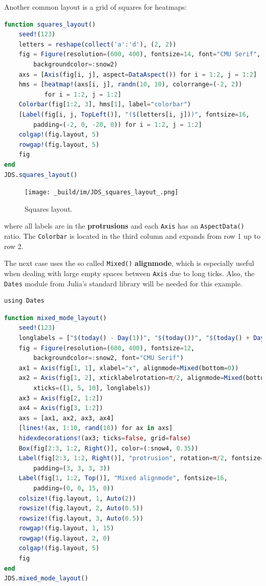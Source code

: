 \documentclass[
  notoc %
]{tufte-book}
\newcommand{\passthrough}[1]{#1}
\begin{document}
Another common layout is a grid of squares for heatmaps:

\begin{lstlisting}[language=Julia]
function squares_layout()
    seed!(123)
    letters = reshape(collect('a':'d'), (2, 2))
    fig = Figure(resolution=(600, 400), fontsize=14, font="CMU Serif",
        backgroundcolor=:snow2)
    axs = [Axis(fig[i, j], aspect=DataAspect()) for i = 1:2, j = 1:2]
    hms = [heatmap!(axs[i, j], randn(10, 10), colorrange=(-2, 2))
           for i = 1:2, j = 1:2]
    Colorbar(fig[1:2, 3], hms[1], label="colorbar")
    [Label(fig[i, j, TopLeft()], "($(letters[i, j]))", fontsize=16,
        padding=(-2, 0, -20, 0)) for i = 1:2, j = 1:2]
    colgap!(fig.layout, 5)
    rowgap!(fig.layout, 5)
    fig
end
JDS.squares_layout()
\end{lstlisting}

\begin{figure}
\hypertarget{fig:squares_layout}{%
\centering
\texttt{[image: \_build/im/JDS\_squares\_layout\_.png]}
\caption{Squares layout.}\label{fig:squares_layout}
}
\end{figure}

where all labels are in the \textbf{protrusions} and each
\passthrough{\lstinline!Axis!} has an
\passthrough{\lstinline!AspectData()!} ratio. The
\passthrough{\lstinline!Colorbar!} is located in the third column and
expands from row 1 up to row 2.

The next case uses the so called \passthrough{\lstinline!Mixed()!}
\textbf{alignmode}, which is especially useful when dealing with large
empty spaces between \passthrough{\lstinline!Axis!} due to long ticks.
Also, the \passthrough{\lstinline!Dates!} module from Julia's standard
library will be needed for this example.

\begin{lstlisting}
using Dates
\end{lstlisting}

\begin{lstlisting}[language=Julia]
function mixed_mode_layout()
    seed!(123)
    longlabels = ["$(today() - Day(1))", "$(today())", "$(today() + Day(1))"]
    fig = Figure(resolution=(600, 400), fontsize=12,
        backgroundcolor=:snow2, font="CMU Serif")
    ax1 = Axis(fig[1, 1], xlabel="x", alignmode=Mixed(bottom=0))
    ax2 = Axis(fig[1, 2], xticklabelrotation=π/2, alignmode=Mixed(bottom=0),
        xticks=([1, 5, 10], longlabels))
    ax3 = Axis(fig[2, 1:2])
    ax4 = Axis(fig[3, 1:2])
    axs = [ax1, ax2, ax3, ax4]
    [lines!(ax, 1:10, rand(10)) for ax in axs]
    hidexdecorations!(ax3; ticks=false, grid=false)
    Box(fig[2:3, 1:2, Right()], color=(:snow4, 0.35))
    Label(fig[2:3, 1:2, Right()], "protrusion", rotation=π/2, fontsize=14,
        padding=(3, 3, 3, 3))
    Label(fig[1, 1:2, Top()], "Mixed alignmode", fontsize=16,
        padding=(0, 0, 15, 0))
    colsize!(fig.layout, 1, Auto(2))
    rowsize!(fig.layout, 2, Auto(0.5))
    rowsize!(fig.layout, 3, Auto(0.5))
    rowgap!(fig.layout, 1, 15)
    rowgap!(fig.layout, 2, 0)
    colgap!(fig.layout, 5)
    fig
end
JDS.mixed_mode_layout()
\end{lstlisting}
\end{document}
